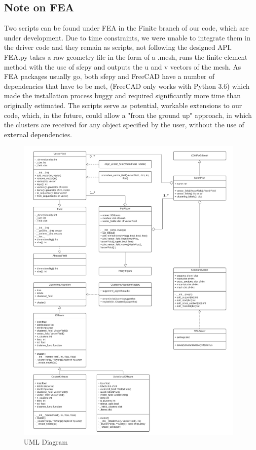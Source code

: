 \documentclass[11pt]{article}
\begin{document}
\subsection{Note on FEA}

Two scripts can be found under FEA in the Finite branch of our code, which are under development. Due to time constraints, we were unable to integrate them in the driver code and they remain as scripts, not following the designed API. FEA.py takes a raw geometry file in the form of a .mesh, runs the finite-element method with the use of sfepy and outputs the u and v vectors of the mesh. As FEA packages usually go, both sfepy and FreeCAD have a number of dependencies that have to be met, (FreeCAD only works with Python 3.6) which made the installation process buggy and required significantly more time than originally estimated. The scripts serve as potential, workable extensions to our code, which, in the future, could allow a "from the ground up" approach, in which the clusters are received for any object specified by the user, without the use of external dependencies.  

\begin{figure}[H]
    \centering
    \includegraphics[scale=0.54]{images/UML-Clusters-Final.jpeg}
	\caption{UML Diagram}
	\label{fig:uml}
\end{figure}
\vspace{30mm}
\end{document}
